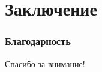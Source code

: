 \section{Заключение}


\begin{frame}
	\frametitle{Благодарность}
	\begin{center}
		Спасибо за внимание!
	\end{center}
	
\end{frame}

